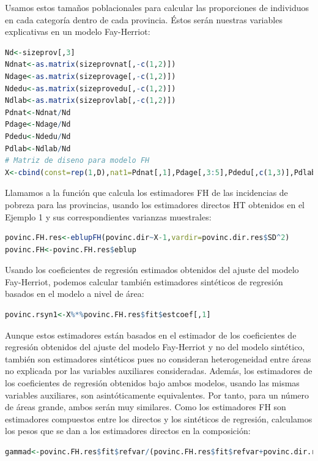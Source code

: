 \documentclass[12pt,spanish]{article}
\begin{document}
Usamos estos tamaños poblacionales para calcular las proporciones de individuos en cada categoría dentro de cada provincia. Éstos serán nuestras variables explicativas en un modelo Fay-Herriot:  
\begin{lstlisting}[language=R]
Nd<-sizeprov[,3] 
Ndnat<-as.matrix(sizeprovnat[,-c(1,2)]) 
Ndage<-as.matrix(sizeprovage[,-c(1,2)]) 
Ndedu<-as.matrix(sizeprovedu[,-c(1,2)]) 
Ndlab<-as.matrix(sizeprovlab[,-c(1,2)]) 
Pdnat<-Ndnat/Nd 
Pdage<-Ndage/Nd 
Pdedu<-Ndedu/Nd 
Pdlab<-Ndlab/Nd 
# Matriz de diseno para modelo FH 
X<-cbind(const=rep(1,D),nat1=Pdnat[,1],Pdage[,3:5],Pdedu[,c(1,3)],Pdlab[,c(2,3)])
\end{lstlisting}

Llamamos a la función que calcula los estimadores FH de las incidencias de pobreza para las provincias, usando los estimadores directos HT obtenidos en el Ejemplo 1 y sus correspondientes varianzas muestrales: 

\begin{lstlisting}[language=R]
povinc.FH.res<-eblupFH(povinc.dir~X-1,vardir=povinc.dir.res$SD^2) 
povinc.FH<-povinc.FH.res$eblup     
\end{lstlisting}

Usando los coeficientes de regresión estimados obtenidos del ajuste del modelo Fay-Herriot, podemos calcular también estimadores sintéticos de regresión basados en el modelo a nivel de área: 
\begin{lstlisting}[language=R]
povinc.rsyn1<-X%*%povinc.FH.res$fit$estcoef[,1]
\end{lstlisting}

Aunque estos estimadores están basados en el estimador de los coeficientes de regresión obtenidos del ajuste del modelo Fay-Herriot y no del modelo sintético, también son estimadores sintéticos pues no consideran heterogeneidad entre áreas no explicada por las variables auxiliares 
consideradas. Además, los estimadores de los coeficientes de regresión obtenidos bajo ambos modelos, usando las mismas variables auxiliares, son asintóticamente equivalentes. Por tanto, para un número de áreas grande, ambos serán muy similares. Como los estimadores FH son estimadores compuestos entre los directos y los sintéticos de regresión, calculamos los pesos que se dan a los estimadores directos en la composición: 

\begin{lstlisting}[language=R]
gammad<-povinc.FH.res$fit$refvar/(povinc.FH.res$fit$refvar+povinc.dir.res$SD^2) 
\end{lstlisting}
\end{document}
